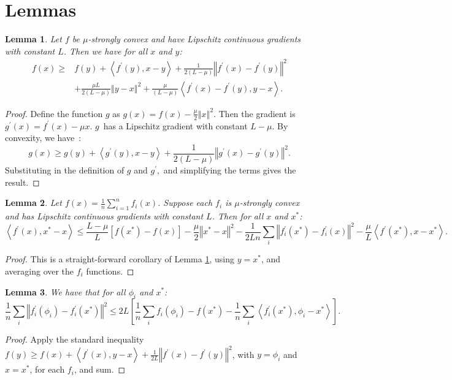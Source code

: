 \documentclass{article}
\newtheorem{lem}{Lemma}
\begin{document}
\section{Lemmas}

\begin{lem}
\label{thm:strong-lb}Let $f$ be $\mu$-strongly convex and have Lipschitz continuous gradients with constant $L$. Then we have for all $x$ and $y$:
\begin{align*}
f(x) \geq {} & f(y)+\left\langle f^{\prime}(y),x-y\right\rangle +\frac{1}{2\left(L-\mu \right)}\left\Vert f^{\prime}(x)-f^{\prime}(y)\right\Vert ^{2} \\
& +\frac{\mu L}{2\left(L-\mu \right)}\left\Vert y-x\right\Vert ^{2}+\frac{\mu}{\left(L-\mu \right)}\left\langle f^{\prime}(x)-f^{\prime}(y),y-x\right\rangle .
\end{align*}
\end{lem}
\begin{proof}
Define the function $g$ as $g(x)=f(x)-\frac{\mu}{2}\left\Vert x\right\Vert ^{2}$.
Then the gradient is $g^{\prime}(x)=f^{\prime}(x)-\mu x$. $g$~has a
Lipschitz gradient with constant $L-\mu$. By convexity, we have~\cite[Thm. 2.1.5]{nes-book}:
\[
g(x)\geq g(y)+\left\langle g^{\prime}(y),x-y\right\rangle +\frac{1}{2(L-\mu)}\left\Vert g^{\prime}(x)-g^{\prime}(y)\right\Vert ^{2}.
\]
Substituting in the definition of $g$ and $g^{\prime},$ and simplifying the
terms gives the result.\end{proof}

\begin{lem}
Let $f(x)=\frac{1}{n}\sum_{i=1}^{n}f_{i}(x)$. Suppose each $f_i$ is $\mu$-strongly convex and has Lipschitz continuous gradients with constant $L$. Then for all $x$ and $x^{*}$:
\begingroup\makeatletter\def\f@size{9}\check@mathfonts
\[
\left\langle f^{\prime}(x),x^{*}-x\right\rangle  \leq 
\frac{L-\mu}{L}\left[f(x^{*})-f(x)\right]-\frac{\mu}{2}\left\Vert x^{*}-x\right\Vert ^{2}-\frac{1}{2Ln}\sum_{i}\left\Vert f_{i}^{\prime}(x^{*})-f_{i}^{\prime}(x)\right\Vert ^{2}-\frac{\mu}{L}\left\langle f^{\prime}(x^{*}),x-x^{*}\right\rangle. 
\]
\endgroup
\end{lem}
\begin{proof}
This is a straight-forward corollary of Lemma \ref{thm:strong-lb}, using $y=x^*$, and averaging over the $f_i$ functions.
\end{proof}

\begin{lem}
\label{lem:grad-diff-phii}
We have that for all $\phi_{i}$ and $x^{*}$:
\[
\frac{1}{n}\sum_{i}\left\Vert f_{i}^{\prime}(\phi_{i})-f_{i}^{\prime}(x^{*})\right\Vert ^{2}
\leq 2L\left[\frac{1}{n}\sum_{i}f_{i}(\phi_{i})-f(x^{*})-\frac{1}{n}\sum_{i}\left\langle f_{i}^{\prime}(x^{*}),\phi_{i}-x^{*}\right\rangle \right].
\]
\end{lem}
\begin{proof}
Apply the standard inequality $f(y)\geq f(x)+\left\langle f^{\prime}(x),y-x\right\rangle +\frac{1}{2L}\left\Vert f^{\prime}(x)-f^{\prime}(y)\right\Vert ^{2}$,
with $y=\phi_{i}$ and $x=x^{*}$, for each $f_{i}$, and sum. \end{proof}
\end{document}
